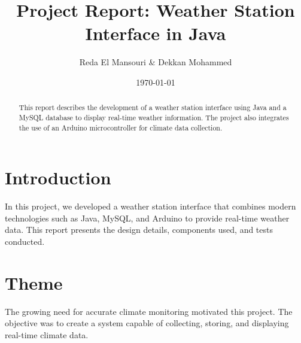 \documentclass[a4paper,12pt]{article}
\title{Project Report: Weather Station Interface in Java}
\author{Reda El Mansouri \& Dekkan Mohammed}
\date{\today}
\begin{document}
	
	\maketitle	
	
	\tableofcontents
	\newpage
	
	\begin{abstract}
		This report describes the development of a weather station interface using Java and a MySQL database to display real-time weather information. The project also integrates the use of an Arduino microcontroller for climate data collection.
	\end{abstract}
	
	\section{Introduction}
	In this project, we developed a weather station interface that combines modern technologies such as Java, MySQL, and Arduino to provide real-time weather data. This report presents the design details, components used, and tests conducted.
	
	\section{Theme}
	The growing need for accurate climate monitoring motivated this project. The objective was to create a system capable of collecting, storing, and displaying real-time climate data.
	
\end{document}
